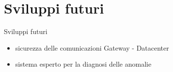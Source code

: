 \documentclass{beamer}
\newcommand{\red}[1]{\textcolor[rgb]{.8,0,0}{#1}}
\begin{document}
\section{Sviluppi futuri}
%
\begin{frame}{Sviluppi futuri}
  \begin{itemize}
    \item \red{sicurezza} delle comunicazioni Gateway - Datacenter
    \item \red{sistema esperto} per la diagnosi delle anomalie
  \end{itemize}
   \begin{figure}[!h]
      \begin{center}
      \end{center}
    \end{figure}
\end{frame}
%
\end{document}
